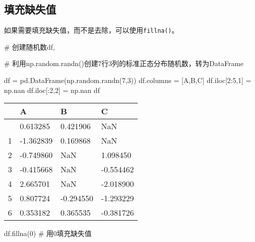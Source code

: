 \documentclass[
  letterpaper,
  DIV=11,
  numbers=noendperiod]{scrreprt}
\newenvironment{Shaded}{\begin{snugshade}}{\end{snugshade}}
\newcommand{\CommentTok}[1]{\textcolor[rgb]{0.37,0.37,0.37}{#1}}
\newcommand{\DecValTok}[1]{\textcolor[rgb]{0.68,0.00,0.00}{#1}}
\newcommand{\NormalTok}[1]{\textcolor[rgb]{0.00,0.23,0.31}{#1}}
\newcommand{\OperatorTok}[1]{\textcolor[rgb]{0.37,0.37,0.37}{#1}}
\newcommand{\StringTok}[1]{\textcolor[rgb]{0.13,0.47,0.30}{#1}}
\begin{document}
\hypertarget{ux586bux5145ux7f3aux5931ux503c}{%
\subsection{填充缺失值}\label{ux586bux5145ux7f3aux5931ux503c}}

如果需要填充缺失值，而不是去除，可以使用\texttt{fillna()}。

\begin{Shaded}
\begin{Highlighting}[]
\CommentTok{\# 创建随机数df,}

\CommentTok{\# 利用np.random.randn()创建7行3列的标准正态分布随机数，转为DataFrame}

\NormalTok{df }\OperatorTok{=}\NormalTok{ pd.DataFrame(np.random.randn(}\DecValTok{7}\NormalTok{,}\DecValTok{3}\NormalTok{)) }
\NormalTok{df.columns }\OperatorTok{=}\NormalTok{ [}\StringTok{\textquotesingle{}A\textquotesingle{}}\NormalTok{,}\StringTok{\textquotesingle{}B\textquotesingle{}}\NormalTok{,}\StringTok{\textquotesingle{}C\textquotesingle{}}\NormalTok{]}
\NormalTok{df.iloc[}\DecValTok{2}\NormalTok{:}\DecValTok{5}\NormalTok{,}\DecValTok{1}\NormalTok{] }\OperatorTok{=}\NormalTok{ np.nan}
\NormalTok{df.iloc[:}\DecValTok{2}\NormalTok{,}\DecValTok{2}\NormalTok{] }\OperatorTok{=}\NormalTok{ np.nan}
\NormalTok{df}
\end{Highlighting}
\end{Shaded}

\begin{longtable}[]{@{}llll@{}}
\toprule\noalign{}
& A & B & C \\
\midrule\noalign{}
\endhead
\bottomrule\noalign{}
\endlastfoot
0 & 0.613285 & 0.421906 & NaN \\
1 & -1.362839 & 0.169868 & NaN \\
2 & -0.749860 & NaN & 1.098450 \\
3 & -0.415668 & NaN & -0.554462 \\
4 & 2.665701 & NaN & -2.018900 \\
5 & 0.807724 & -0.294550 & -1.293229 \\
6 & 0.353182 & 0.365535 & -0.381726 \\
\end{longtable}

\begin{Shaded}
\begin{Highlighting}[]
\NormalTok{df.fillna(}\DecValTok{0}\NormalTok{) }\CommentTok{\# 用0填充缺失值}
\end{Highlighting}
\end{Shaded}
\end{document}
